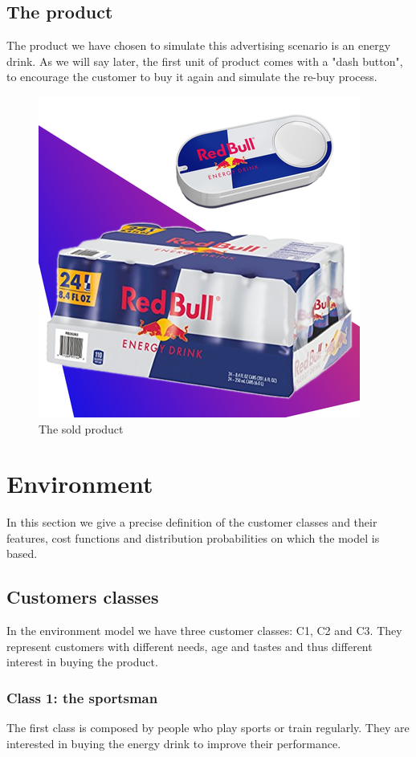 \documentclass[12pt,a4paper]{report}
\begin{document}
\section{The product}
The product we have chosen to simulate this advertising scenario is an energy drink. As we will say later, the first unit of product comes with a "dash button", to encourage the customer to buy it again and simulate the re-buy process.
\begin{figure}[H]
\centering
  \includegraphics[scale = 0.7, center]{redbull-dash}
  \caption{The sold product}
\end{figure}

	\chapter{Environment}	
		\label{chap:env}	
In this section we give a precise definition of the customer classes and their features, cost functions and distribution probabilities on which the model is based.

		\section{Customers classes}
In the environment model we have three customer classes: C1, C2 and C3.
They represent customers with different needs, age and tastes and thus different interest in buying the product.

			\subsection{Class 1: the sportsman}
The first class is composed by people who play sports or train regularly. They are interested in buying the energy drink to improve their performance. 
\end{document}
